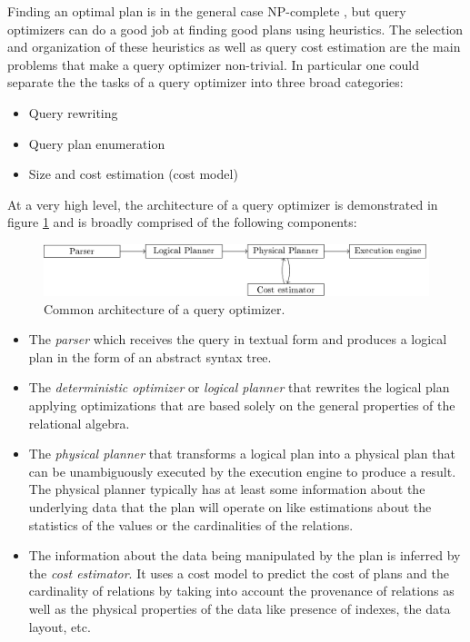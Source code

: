 Finding an optimal plan is in the general case NP-complete
\cite{ullmanInformationIntegrationUsing1997}, but query optimizers can
do a good job at finding good plans using heuristics. The selection
and organization of these heuristics as well as query cost estimation
are the main problems that make a query optimizer non-trivial. In
particular one could separate the the tasks of a query optimizer
into three broad categories:

\begin{itemize}
\item Query rewriting
\item Query plan enumeration
\item Size and cost estimation (cost model)
\end{itemize}

At a very high level, the architecture of a query optimizer is
demonstrated in figure \ref{fig:org171f336} and is broadly
comprised of the following components:

\begin{figure}[p]
\centering
\includegraphics[width=\textwidth]{./imgs/optimizer_architecture.pdf}
\caption{\label{fig:org171f336}Common architecture of a query optimizer.}
\end{figure}

\begin{itemize}
\item The \emph{parser} which receives the query in textual form and produces a
logical plan in the form of an abstract syntax tree.
\item The \emph{deterministic optimizer} or \emph{logical planner} that rewrites the
logical plan applying optimizations that are based solely on the
general properties of the relational algebra.
\item The \emph{physical planner} that transforms a logical plan into a
physical plan that can be unambiguously executed by the execution
engine to produce a result. The physical planner typically has at
least some information about the underlying data that the plan will
operate on like estimations about the statistics of the values or
the cardinalities of the relations.
\item The information about the data being manipulated by the plan is
inferred by the \emph{cost estimator}. It uses a cost model to predict
the cost of plans and the cardinality of relations by taking into
account the provenance of relations as well as the physical properties
of the data like presence of indexes, the data layout, etc.
\end{itemize}

